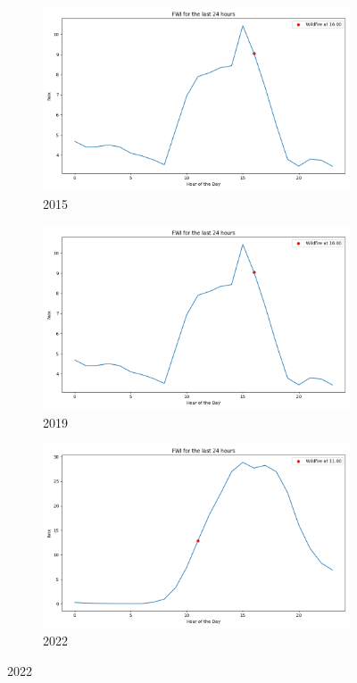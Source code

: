 \begin{figure}[h]
	\centering
	\caption{Hourly FWI value for the day of wildfire occurence}
	\begin{subfigure}{0.45\textwidth}
		\centering
		\includegraphics[width=\textwidth]{graphs/variables/fwix_24_2015.png}
		\caption{2015}
	\end{subfigure}
	\hfill
	\begin{subfigure}{0.45\textwidth}
		\centering
		\includegraphics[width=\textwidth]{graphs/variables/fwix_24_2015.png}
		\caption{2019}
	\end{subfigure}
	\hfill
	\begin{subfigure}{0.45\textwidth}
		\centering
		\includegraphics[width=\textwidth]{graphs/variables/fwix_24_2019.png}
		\caption{2022}
	\end{subfigure}
	
	\label{fig:daily_fwix_2015_2019_2020}
\end{figure}


